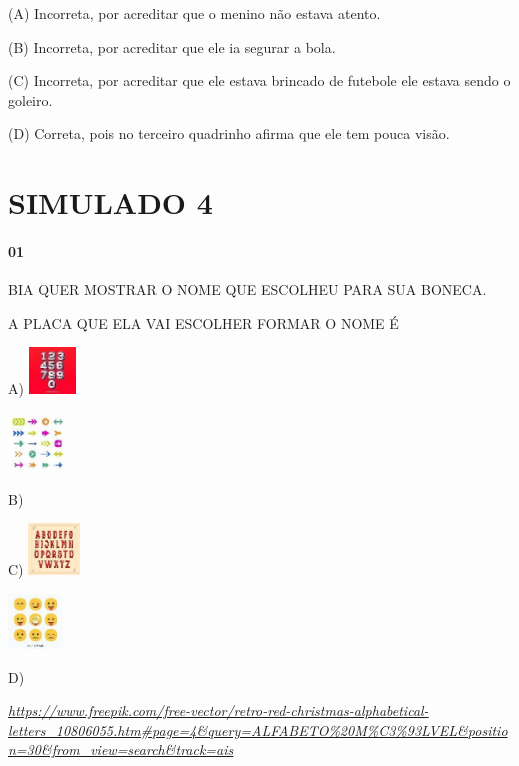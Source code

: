 \begin{escola}
(A) Incorreta, por acreditar que o menino não estava atento.

(B) Incorreta, por acreditar que ele ia segurar a bola.

(C) Incorreta, por acreditar que ele estava brincado de futebole ele
estava sendo o goleiro.

(D) Correta, pois no terceiro quadrinho afirma que ele tem pouca visão.

\chapter{SIMULADO 4}

\subsubsection{01}\label{section-73}

BIA QUER MOSTRAR O NOME QUE ESCOLHEU PARA SUA BONECA.

A PLACA QUE ELA VAI ESCOLHER FORMAR O NOME É

A)
\includegraphics[width=0.48889in,height=0.48889in]{media/image239.jpg}

\includegraphics[width=0.60625in,height=0.60625in]{media/image240.jpg}

B)

C)
\includegraphics[width=0.54236in,height=0.54236in]{media/image241.jpg}

\includegraphics[width=0.57431in,height=0.57431in]{media/image242.jpg}

D)

\href{https://www.freepik.com/free-vector/retro-red-christmas-alphabetical-letters_10806055.htm\#page=4\&query=ALFABETO\%20M\%C3\%93LVEL\&position=30\&from_view=search\&track=ais}{\emph{https://www.freepik.com/free-vector/retro-red-christmas-alphabetical-letters\_10806055.htm\#page=4\&query=ALFABETO\%20M\%C3\%93LVEL\&position=30\&from\_view=search\&track=ais}}


\end{escola}
